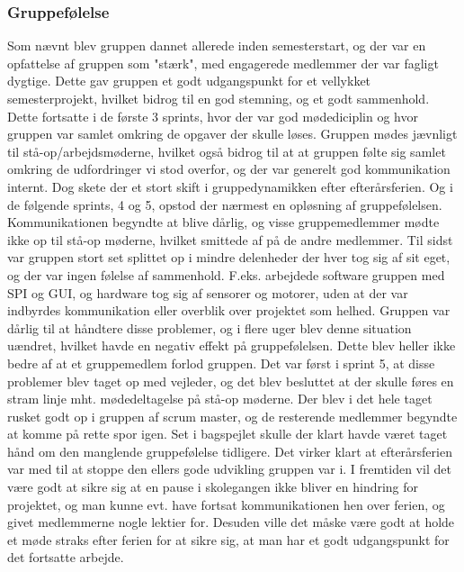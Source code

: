 \subsubsection{Gruppefølelse}
Som nævnt blev gruppen dannet allerede inden semesterstart, og der var en opfattelse af gruppen som "stærk", med engagerede medlemmer der var fagligt dygtige.
Dette gav gruppen et godt udgangspunkt for et vellykket semesterprojekt, hvilket bidrog til en god stemning, og et godt sammenhold. Dette fortsatte i de første
3 sprints, hvor der var god mødediciplin og hvor gruppen var samlet omkring de opgaver der skulle løses. Gruppen mødes jævnligt til stå-op/arbejdsmøderne,
hvilket også bidrog til at at gruppen følte sig samlet omkring de udfordringer vi stod overfor, og der var generelt god kommunikation internt. Dog skete der et 
stort skift i gruppedynamikken efter efterårsferien. Og i de følgende sprints, 4 og 5, opstod der nærmest en opløsning af gruppefølelsen. Kommunikationen begyndte 
at blive dårlig, og visse gruppemedlemmer mødte ikke op til stå-op møderne, hvilket smittede af på de andre medlemmer. Til sidst var gruppen stort set splittet
op i mindre delenheder der hver tog sig af sit eget, og der var ingen følelse af sammenhold. F.eks. arbejdede software gruppen med SPI og GUI, og hardware 
tog sig af sensorer og motorer, uden at der var indbyrdes kommunikation eller overblik over projektet som helhed. Gruppen var dårlig til at håndtere disse 
problemer, og i flere uger blev denne situation uændret, hvilket havde en negativ effekt på gruppefølelsen. Dette blev heller ikke bedre af at et gruppemedlem 
forlod gruppen. Det var først i sprint 5, at disse problemer blev taget op med vejleder, og det blev besluttet at der skulle føres en stram linje mht. mødedeltagelse
på stå-op møderne. Der blev i det hele taget rusket godt op i gruppen af scrum master, og de resterende medlemmer begyndte at komme på rette spor igen. Set i bagspejlet
skulle der klart havde været taget hånd om den manglende gruppefølelse tidligere. Det virker klart at efterårsferien var med til at stoppe den ellers
gode udvikling gruppen var i. I fremtiden vil det være godt at sikre sig at en pause i skolegangen ikke bliver en hindring for projektet, og man kunne evt. 
have fortsat kommunikationen hen over ferien, og givet medlemmerne nogle lektier for. Desuden ville det måske være godt at holde et møde straks efter ferien
for at sikre sig, at man har et godt udgangspunkt for det fortsatte arbejde.  

